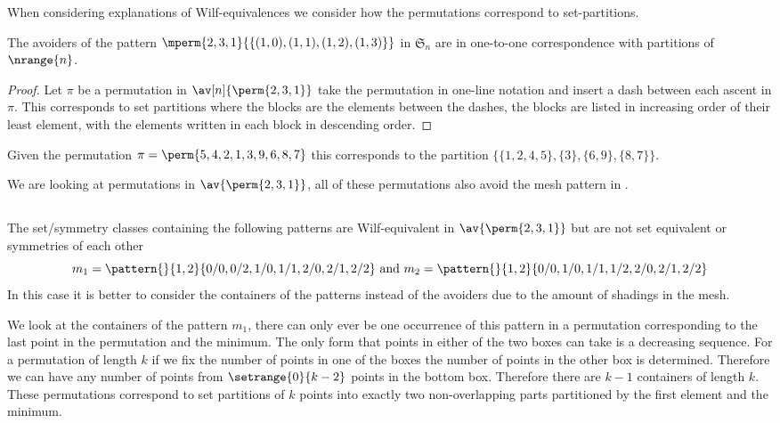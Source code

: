 When considering explanations of Wilf-equivalences we consider how the
permutations correspond to set-partitions.

\begin{note}
    \label{not:setequiv}
    The avoiders of the pattern \(\mperm{2,3,1}{\{(1,0),(1,1),(1,2),(1,3)\}}\)
    in \(\mathfrak{S}_n\) are in one-to-one correspondence with partitions of
    \(\nrange{n}\). \cite{DBLP:journals/ejc/Claesson01}
\end{note}
\begin{proof}
    Let \(\pi\) be a permutation in \(\av[n]{\perm{2,3,1}}\) take the permutation
    in one-line notation and insert a dash between each ascent in \(\pi\). This
    corresponds to set partitions where the blocks are the elements between the
    dashes, the blocks are listed in increasing order of their least element,
    with the elements written in each block in descending order.
\end{proof}

\begin{example}
    Given the permutation \(\pi = \perm{5,4,2,1,3,9,6,8,7}\) this corresponds to the
    partition \(\{\{1,2,4,5\},\{3\},\{6,9\},\{8,7\}\}\).
\end{example}

We are looking at permutations in \(\av{\perm{2,3,1}}\), all of these permutations
also avoid the mesh pattern in .

\subsection{}
The set/symmetry classes containing the following patterns are
Wilf-equivalent in \(\av{\perm{2,3,1}}\) but are not set equivalent or
symmetries of each other
\begin{equation*}
    m_1 = \pattern{}{1,2}{0/0,0/2,
                    1/0,1/1,
                    2/0,2/1,2/2}
    \text{ and }
    m_2 = \pattern{}{1,2}{0/0,
                    1/0,1/1,1/2,
                    2/0,2/1,2/2}
\end{equation*}
In this case it is better to consider the containers of the patterns
instead of the avoiders due to the amount of shadings in the mesh.

We look at the containers of the pattern \(m_1\), there can only ever
be one occurrence of this pattern in a permutation corresponding to
the last point in the permutation and the minimum. The only form that
points in either of the two boxes can take is a decreasing sequence.
For a permutation of length \(k\) if we fix the number of points in
one of the boxes the number of points in the other box is determined.
Therefore we can have any number of points from \(\setrange{0}{k-2}\)
points in the bottom box. Therefore there are \(k-1\) containers of
length \(k\). These permutations correspond to set partitions of \(k\)
points into exactly two non-overlapping parts partitioned by the first
element and the minimum.

